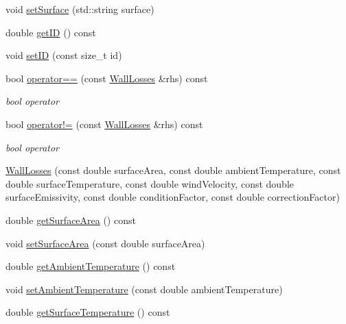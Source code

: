 \begin{DoxyCompactItemize}
void \hyperlink{class_wall_losses_af329a27b78e1f2d84af6a48ffc59bfad}{set\+Surface} (std\+::string surface)
\item 
double \hyperlink{class_wall_losses_ad67b46094ba89cb759ec124c63c137de}{get\+ID} () const
\item 
void \hyperlink{class_wall_losses_a91526efc0eb1bf030ebc1d864a21acdd}{set\+ID} (const size\+\_\+t id)
\item 
\mbox{\label{class_wall_losses_ad9eebb34927690332c00df51507878e9}} 
bool \hyperlink{class_wall_losses_ad9eebb34927690332c00df51507878e9}{operator==} (const \hyperlink{class_wall_losses}{Wall\+Losses} \&rhs) const
\begin{DoxyCompactList}\small\item\em bool operator \end{DoxyCompactList}\item 
\mbox{\label{class_wall_losses_a46d50205e67870978292c4bfa1c9d329}} 
bool \hyperlink{class_wall_losses_a46d50205e67870978292c4bfa1c9d329}{operator!=} (const \hyperlink{class_wall_losses}{Wall\+Losses} \&rhs) const
\begin{DoxyCompactList}\small\item\em bool operator \end{DoxyCompactList}\item 
\hyperlink{class_wall_losses_a7d46f259c632ecdcde5ae31468c03e2e}{Wall\+Losses} (const double surface\+Area, const double ambient\+Temperature, const double surface\+Temperature, const double wind\+Velocity, const double surface\+Emissivity, const double condition\+Factor, const double correction\+Factor)
\item 
double \hyperlink{class_wall_losses_ad4d3aa549cc7ab19e927823dbafed973}{get\+Surface\+Area} () const
\item 
void \hyperlink{class_wall_losses_acbbbe4b1ec44bb04e5e1db944017995c}{set\+Surface\+Area} (const double surface\+Area)
\item 
double \hyperlink{class_wall_losses_a806cb5860fe78d0379e3877f043655ad}{get\+Ambient\+Temperature} () const
\item 
void \hyperlink{class_wall_losses_a08a8f4c9add0ce78733be4558cc8410b}{set\+Ambient\+Temperature} (const double ambient\+Temperature)
\item 
double \hyperlink{class_wall_losses_ac2ce3cea6eef435a5fcf6a659b8e7d70}{get\+Surface\+Temperature} () const
\item 

\end{DoxyCompactItemize}
